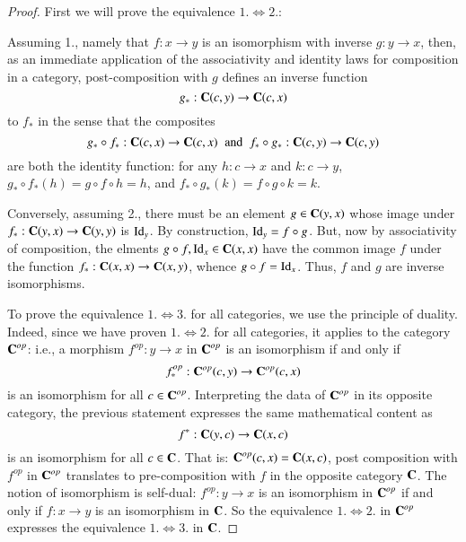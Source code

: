 \begin{proof}
    First we will prove the equivalence $1. \iff 2.$:

    Assuming 1., namely that $f:x\rightarrow y$ is an isomorphism with inverse $g:y\rightarrow x$, then, as an immediate application of the associativity and identity laws for composition in a category, post-composition with $g$ defines an inverse function \begin{equation*}
        g_*:\normalfont\textbf{C}(c,y)\rightarrow \normalfont\textbf{C}(c,x)
    \end{equation*}
    to $f_*$ in the sense that the composites \begin{equation*}
        g_*\circ f_*:\normalfont\textbf{C}(c,x)\rightarrow \normalfont\textbf{C}(c,x)\;\;\text{and}\;\;f_*\circ g_*:\normalfont\textbf{C}(c,y)\rightarrow \normalfont\textbf{C}(c,y)
    \end{equation*}
    are both the identity function: for any $h:c\rightarrow x$ and $k:c\rightarrow y$, $g_*\circ f_*(h) = g\circ f\circ h = h$, and $f_*\circ g_*(k) = f\circ g \circ k = k$.

    Conversely, assuming 2., there must be an element $g \in \normalfont\textbf{C}(y,x)$ whose image under $f_*:\normalfont\textbf{C}(y,x)\rightarrow \normalfont\textbf{C}(y,y)$ is $\operatorname{Id}_y$. By construction, $\operatorname{Id}_y = f\circ g$. But, now by associativity of composition, the elments $g\circ f, \operatorname{Id}_x \in \normalfont\textbf{C}(x,x)$ have the common image $f$ under the function $f_*:\normalfont\textbf{C}(x,x)\rightarrow \normalfont\textbf{C}(x,y)$, whence $g\circ f = \operatorname{Id}_x$. Thus, $f$ and $g$ are inverse isomorphisms.

    To prove the equivalence $1.\iff 3.$ for all categories, we use the principle of duality. Indeed, since we have proven $1.\iff 2.$ for all categories, it applies to the category $\normalfont\textbf{C}^{op}$: i.e., a morphism $f^{op}:y\rightarrow x$ in $\normalfont\textbf{C}^{op}$ is an isomorphism if and only if \begin{equation*}
        f_*^{op}:\normalfont\textbf{C}^{op}(c,y)\rightarrow \normalfont\textbf{C}^{op}(c,x)
    \end{equation*}
    is an isomorphism for all $c \in \normalfont\textbf{C}^{op}$. Interpreting the data of $\normalfont\textbf{C}^{op}$ in its opposite category, the previous statement expresses the same mathematical content as \begin{equation*}
        f^*:\normalfont\textbf{C}(y,c)\rightarrow\normalfont\textbf{C}(x,c)
    \end{equation*}
    is an isomorphism for all $c \in \normalfont\textbf{C}$. That is: $\normalfont\textbf{C}^{op}(c,x) = \normalfont\textbf{C}(x,c)$, post composition with $f^{op}$ in $\normalfont\textbf{C}^{op}$ translates to pre-composition with $f$ in the opposite category $\normalfont\textbf{C}$. The notion of isomorphism is self-dual: $f^{op}:y\rightarrow x$ is an isomorphism in $\normalfont\textbf{C}^{op}$ if and only if $f:x\rightarrow y$ is an isomorphism in $\normalfont\textbf{C}$. So the equivalence $1.\iff 2.$ in $\normalfont\textbf{C}^{op}$ expresses the equivalence $1.\iff 3.$ in $\normalfont\textbf{C}$.
\end{proof}

